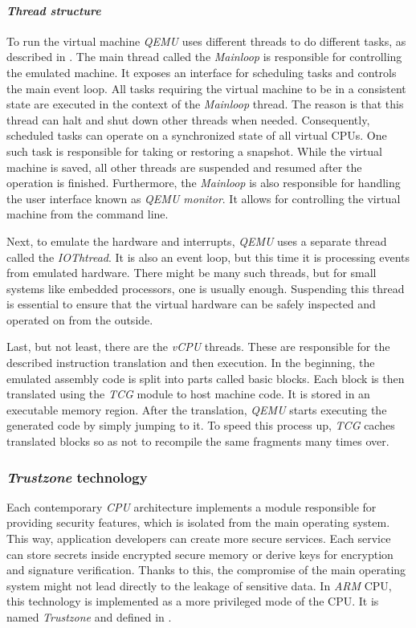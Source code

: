 \paragraph{\textit{Thread structure}}
To run the virtual machine \textit{QEMU} uses different threads to do different tasks, as described in \cite{qemuthreads}. The main thread called the \textit{Mainloop} is responsible for controlling the emulated machine. It exposes an interface for scheduling tasks and controls the main event loop. All tasks requiring the virtual machine to be in a consistent state are executed in the context of the \textit{Mainloop} thread. The reason is that this thread can halt and shut down other threads when needed. Consequently, scheduled tasks can operate on a synchronized state of all virtual CPUs. One such task is responsible for taking or restoring a snapshot. While the virtual machine is saved, all other threads are suspended and resumed after the operation is finished. Furthermore, the \textit{Mainloop} is also responsible for handling the user interface known as \textit{QEMU monitor}. It allows for controlling the virtual machine from the command line.

Next, to emulate the hardware and interrupts, \textit{QEMU} uses a separate thread called the \textit{IOThtread}. It is also an event loop, but this time it is processing events from emulated hardware. There might be many such threads, but for small systems like embedded processors, one is usually enough. Suspending this thread is essential to ensure that the virtual hardware can be safely inspected and operated on from the outside.

Last, but not least, there are the \textit{vCPU} threads. These are responsible for the described instruction translation and then execution. In the beginning, the emulated assembly code is split into parts called basic blocks. Each block is then translated using the \textit{TCG} module to host machine code. It is stored in an executable memory region. After the translation, \textit{QEMU} starts executing the generated code by simply jumping to it. To speed this process up, \textit{TCG} caches translated blocks so as not to recompile the same fragments many times over. 



\subsubsection{\textit{Trustzone} technology} \label{sec:tz}
Each contemporary \textit{CPU} architecture implements a module responsible for providing security features, which is isolated from the main operating system. This way, application developers can create more secure services. Each service can store secrets inside encrypted secure memory or derive keys for encryption and signature verification. Thanks to this, the compromise of the main operating system might not lead directly to the leakage of sensitive data. In \textit{ARM} CPU, this technology is implemented as a more privileged mode of the CPU. It is named \textit{Trustzone} and defined in \cite{trustzonedoc}.

